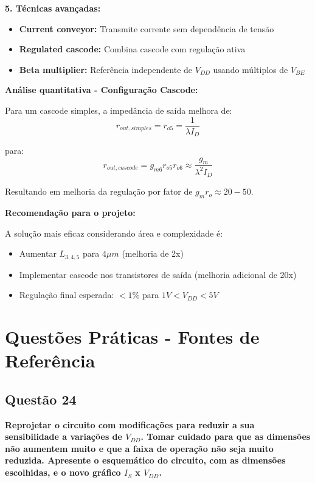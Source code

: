 ﻿\documentclass[12pt,a4paper]{article}
\begin{document}
\textbf{5. Técnicas avançadas:}
\begin{itemize}
    \item \textbf{Current conveyor:} Transmite corrente sem dependência de tensão
    \item \textbf{Regulated cascode:} Combina cascode com regulação ativa
    \item \textbf{Beta multiplier:} Referência independente de $V_{DD}$ usando múltiplos de $V_{BE}$
\end{itemize}

\textbf{Análise quantitativa - Configuração Cascode:}

Para um cascode simples, a impedância de saída melhora de:
$$r_{out,simples} = r_{o5} = \frac{1}{\lambda I_D} $$

para:
$$r_{out,cascode} = g_{m6} r_{o5} r_{o6} \approx \frac{g_m}{\lambda^2 I_D} $$

Resultando em melhoria da regulação por fator de $g_m r_o \approx 20-50$.

\textbf{Recomendação para o projeto:}

A solução mais eficaz considerando área e complexidade é:
\begin{itemize}
    \item Aumentar $L_{3,4,5}$ para $4\mu m$ (melhoria de 2x)
    \item Implementar cascode nos transistores de saída (melhoria adicional de 20x)
    \item Regulação final esperada: $< 1\%$ para $1V < V_{DD} < 5V$
\end{itemize}

\newpage

\section*{Questões Práticas - Fontes de Referência}

\subsection*{Questão 24}

\textbf{Reprojetar o circuito com modificações para reduzir a sua sensibilidade a variações de $V_{DD}$. Tomar cuidado para que as dimensões não aumentem muito e que a faixa de operação não seja muito reduzida. Apresente o esquemático do circuito, com as dimensões escolhidas, e o novo gráfico $I_S$ x $V_{DD}$.}
\end{document}
